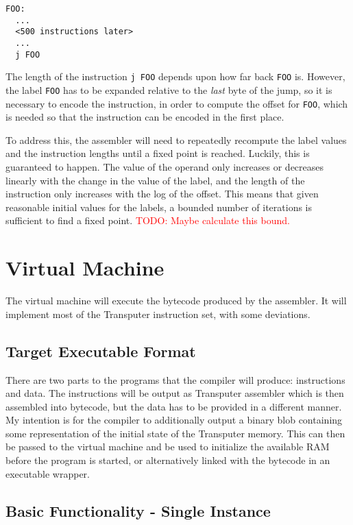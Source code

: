 \begin{lstlisting}
FOO:
  ...
  <500 instructions later>
  ...
  j FOO
\end{lstlisting}

The length of the instruction \texttt{j FOO} depends upon how far back
\texttt{FOO} is. However, the label \texttt{FOO} has to be expanded relative to
the \textit{last} byte of the jump, so it is necessary to encode the
instruction, in order to compute the offset for \texttt{FOO}, which is needed so
that the instruction can be encoded in the first place.

To address this, the assembler will need to repeatedly recompute the label
values and the instruction lengths until a fixed point is reached. Luckily, this
is guaranteed to happen. The value of the operand only increases or decreases
linearly with the change in the value of the label, and the length of the
instruction only increases with the log of the offset. This means that given
reasonable initial values for the labels, a bounded number of iterations is
sufficient to find a fixed point. \textcolor{red}{TODO: Maybe calculate this
bound.}

\section{Virtual Machine}

The virtual machine will execute the bytecode produced by the assembler. It will
implement most of the Transputer instruction set, with some deviations.

\subsection{Target Executable Format}

There are two parts to the programs that the compiler will produce:
instructions and data. The instructions will be output as Transputer assembler
which is then assembled into bytecode, but the data has to be provided in a
different manner. My intention is for the compiler to additionally output a
binary blob containing some representation of the initial state of the
Transputer memory. This can then be passed to the virtual machine and be used to
initialize the available RAM before the program is started, or alternatively
linked with the bytecode in an executable wrapper.

\subsection{Basic Functionality - Single Instance}

